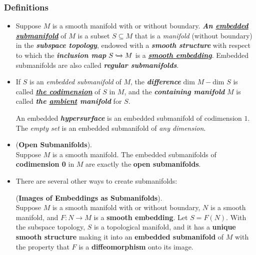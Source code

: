 \documentclass[11pt]{article}
\begin{document}
\subsubsection{Definitions}
\begin{itemize}
\item \begin{definition}
Suppose $M$ is a smooth manifold with or without boundary. \emph{\textbf{An \underline{embedded} \underline{submanifold}}} of $M$ is a subset $S \subseteq M$ that is a \emph{manifold} (without boundary) in the \emph{\textbf{subspace topology}}, endowed with a \emph{\textbf{smooth structure}} with respect to which the \emph{\textbf{inclusion map}} $S \xhookrightarrow{} M$ is a \underline{\emph{\textbf{smooth embedding}}}. Embedded submanifolds are also called \emph{\textbf{regular submanifolds}}.
\end{definition}

\item \begin{definition}
If $S$ is an \emph{embedded submanifold} of $M$, the \emph{\textbf{difference}} $\text{dim }M - \text{dim }S$ is called
\underline{\emph{\textbf{the codimension}}} of $S$ in $M$, and the \emph{\textbf{containing manifold}} $M$ is called \emph{\textbf{the \underline{ambient} manifold}} for $S$. 

An embedded \emph{\textbf{hypersurface}} is an embedded submanifold of codimension $1$. The \emph{empty set} is an embedded submanifold of \emph{any dimension}.
\end{definition}

\item \begin{proposition}(\textbf{Open Submanifolds}). \citep{lee2003introduction}\\
Suppose $M$ is a smooth manifold. The embedded submanifolds of \textbf{codimension 0} in $M$ are exactly the \textbf{open submanifolds}.
\end{proposition}

\item There are several other ways to create submanifolds:
\begin{proposition} (\textbf{Images of Embeddings as Submanifolds}). \citep{lee2003introduction} \\
Suppose $M$ is a smooth manifold with or without boundary, $N$ is a smooth manifold, and $F: N \rightarrow M$ is a \textbf{smooth embedding}. Let $S = F(N)$. With the subspace topology, $S$ is a topological manifold, and it has a \textbf{unique smooth structure} making it into an \textbf{embedded submanifold} of $M$ with the property that $F$ is a \textbf{diffeomorphism} onto its image.
\end{proposition}


\end{itemize}
\end{document}
